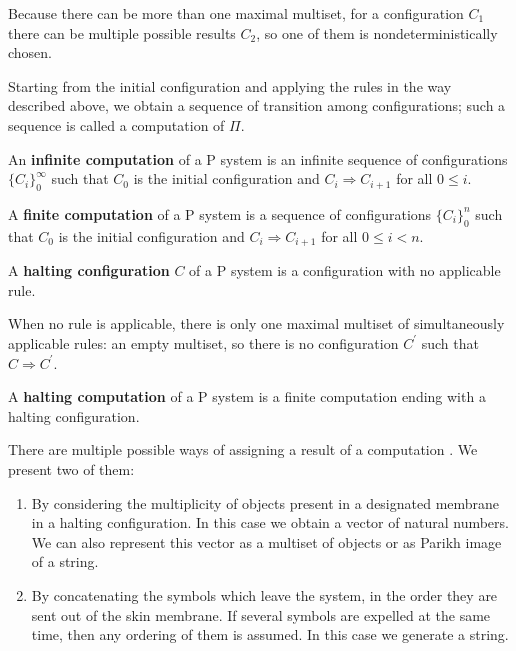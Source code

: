 Because there can be more than one maximal multiset, for a configuration $C_1$ there can be multiple possible results $C_2$, so one of them is nondeterministically chosen.

Starting from the initial configuration and applying the rules in the way described above, we obtain a sequence of transition among configurations; such a sequence is called a computation of $\Pi$.

\begin{definition}
  An {\bf infinite computation} of a P system is an infinite sequence of configurations $\{C_i\}_0^\infty$ such that $C_0$ is the initial configuration and $C_i\Rightarrow C_{i+1}$ for all $0\leq i$.
\end{definition}

\begin{definition}
  A {\bf finite computation} of a P system is a sequence of configurations $\{C_i\}_0^n$ such that $C_0$ is the initial configuration and $C_i\Rightarrow C_{i+1}$ for all $0\leq i<n$.
\end{definition}

\begin{definition}
  A {\bf halting configuration} $C$ of a P system is a configuration with no applicable rule.
\end{definition}

When no rule is applicable, there is only one maximal multiset of simultaneously applicable rules: an empty multiset, so there is no configuration $C^\prime$ such that $C\Rightarrow C^\prime$.

\begin{definition}
  A {\bf halting computation} of a P system is a finite computation ending with a halting configuration.
\end{definition}


There are multiple possible ways of assigning a result of a computation \cite{Besozzi:PhD:2004}. We present two of them:

\begin{enumerate}
    \item By considering the multiplicity of objects present in a designated membrane in a halting configuration. In this case we obtain a vector of natural numbers. We can also represent this vector as a multiset of objects or as Parikh image of a string.
    \item By concatenating the symbols which leave the system, in the order they are sent out of the skin membrane. If several symbols are expelled at the same time, then any ordering of them is assumed. In this case we generate a string.
\end{enumerate}

